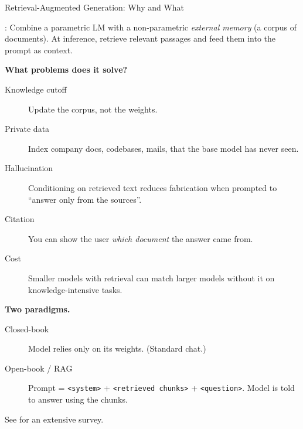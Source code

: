 \begin{frame}{Retrieval-Augmented Generation: Why and What}

  \cite{lewis2020rag}: Combine a parametric LM with a non-parametric \emph{external memory}
  (a corpus of documents). At inference, retrieve relevant passages and feed them into
  the prompt as context.

  \vspace{0.3em}
  \textbf{What problems does it solve?}
  \begin{description}
    \item[Knowledge cutoff] Update the corpus, not the weights.
    \item[Private data] Index company docs, codebases, mails, that the base model has never seen.
    \item[Hallucination] Conditioning on retrieved text reduces fabrication when prompted to ``answer only from the sources''.
    \item[Citation] You can show the user \emph{which document} the answer came from.
    \item[Cost] Smaller models with retrieval can match larger models without it on knowledge-intensive tasks.
  \end{description}

  \vspace{0.4em}
  \textbf{Two paradigms.}
  \begin{description}
    \item[Closed-book] Model relies only on its weights. (Standard chat.)
    \item[Open-book / RAG] Prompt = \texttt{<system>} + \texttt{<retrieved chunks>} + \texttt{<question>}. Model is told to answer using the chunks.
  \end{description}
  See \cite{gao2023ragsurvey} for an extensive survey.
\end{frame}

